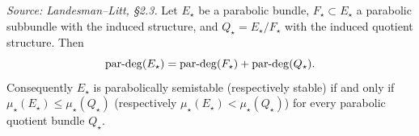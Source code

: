 \begin{lemma}
  \label{lem:quotient-semistable}
  \textit{Source: Landesman--Litt, \S2.3.}
  Let $E_\star$ be a parabolic bundle, $F_\star \subset E_\star$ a parabolic
  subbundle with the induced structure, and $Q_\star = E_\star/F_\star$ with the
  induced quotient structure. Then
  \[
    \operatorname{par\text{-}deg}(E_\star) = \operatorname{par\text{-}deg}(F_\star) + \operatorname{par\text{-}deg}(Q_\star) .
  \]
  Consequently $E_\star$ is parabolically semistable (respectively stable) if and
  only if $\mu_\star(E_\star) \leq \mu_\star(Q_\star)$ (respectively
  $\mu_\star(E_\star) < \mu_\star(Q_\star)$) for every parabolic quotient
  bundle $Q_\star$.
\end{lemma}


